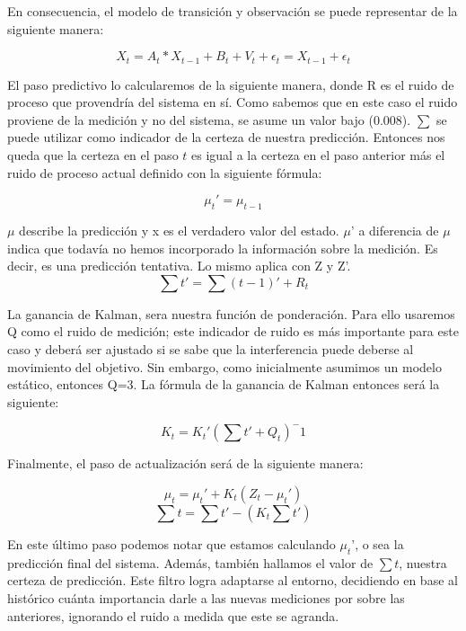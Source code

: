  En consecuencia, el modelo de transición y observación se puede representar de la siguiente manera:

\[X_{t} = A_{t} * X_{t-1} + B_{t} + V_{t} + \epsilon_{t} = X_{t-1} + \epsilon_{t} \]

El paso predictivo lo calcularemos de la siguiente manera, donde R es el ruido de proceso que provendría del sistema en sí. Como sabemos que en este caso el ruido proviene de la medición y no del sistema, se asume un valor bajo (0.008). \(\sum\) se puede utilizar como indicador de la certeza de nuestra predicción. Entonces nos queda que la certeza en el paso \(t\) es igual a la certeza en el paso anterior más el ruido de proceso actual definido con la siguiente fórmula:

\[ \mu_{t}' = \mu_{t-1}  \]

\(\mu\) describe la predicción y x es el verdadero valor del estado. \(\mu’\) a diferencia de \(\mu\) indica que todavía no hemos incorporado la información sobre la medición. Es decir, es una predicción tentativa. Lo mismo aplica con Z y Z’.
\[\sum t' = \sum (t-1)' + R_{t} \]

La ganancia de Kalman, sera nuestra función de ponderación. Para ello usaremos Q como el ruido de medición; este indicador de ruido es más importante para este caso y deberá ser ajustado si se sabe que la interferencia puede deberse al movimiento del objetivo. Sin embargo, como inicialmente asumimos un modelo estático, entonces Q=3. La fórmula de la ganancia de Kalman entonces será la siguiente: 

\[K_{t} = K_{t}' ( \sum t' + Q_{t})^-1\]

Finalmente, el paso de actualización será de la siguiente manera:

\[ \mu_{t} = \mu_{t}' + K_{t}(Z_{t}-\mu_{t}')\]
\[ \sum t = \sum t' - (K_{t} \sum t')\]

En este último paso podemos notar que estamos calculando \(\mu_{t}’\), o sea la predicción final del sistema. Además, también hallamos el valor de \(\sum t\), nuestra certeza de predicción.
Este filtro logra adaptarse al entorno, decidiendo en base al histórico cuánta importancia darle a las nuevas mediciones por sobre las anteriores, ignorando el ruido a medida que este se agranda.





